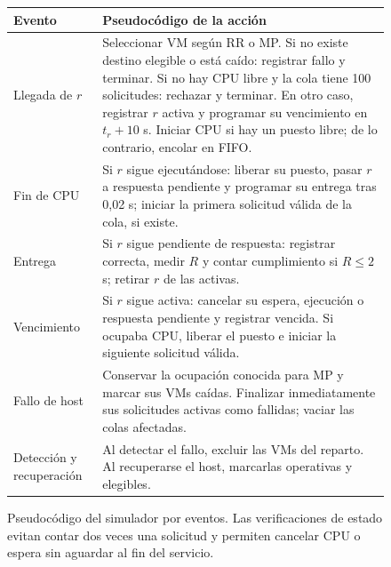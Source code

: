 \begin{figure}[t]
\centering\footnotesize
\begin{tabularx}{\columnwidth}{@{}>{\raggedright\arraybackslash}p{}Y@{}}
\toprule
\textbf{Evento} & \textbf{Pseudocódigo de la acción}\\\midrule
Llegada de $r$ & Seleccionar VM según RR o MP. Si no existe destino elegible o está caído: registrar fallo y terminar. Si no hay CPU libre y la cola tiene 100 solicitudes: rechazar y terminar. En otro caso, registrar $r$ activa y programar su vencimiento en $t_r+10$ s. Iniciar CPU si hay un puesto libre; de lo contrario, encolar en FIFO.\\[3pt]
Fin de CPU & Si $r$ sigue ejecutándose: liberar su puesto, pasar $r$ a respuesta pendiente y programar su entrega tras 0,02 s; iniciar la primera solicitud válida de la cola, si existe.\\[3pt]
Entrega & Si $r$ sigue pendiente de respuesta: registrar correcta, medir $R$ y contar cumplimiento si $R\leq2$ s; retirar $r$ de las activas.\\[3pt]
Vencimiento & Si $r$ sigue activa: cancelar su espera, ejecución o respuesta pendiente y registrar vencida. Si ocupaba CPU, liberar el puesto e iniciar la siguiente solicitud válida.\\[3pt]
Fallo de host & Conservar la ocupación conocida para MP y marcar sus VMs caídas. Finalizar inmediatamente sus solicitudes activas como fallidas; vaciar las colas afectadas.\\[3pt]
Detección y recuperación & Al detectar el fallo, excluir las VMs del reparto. Al recuperarse el host, marcarlas operativas y elegibles.\\\bottomrule
\end{tabularx}
\caption{Pseudocódigo del simulador por eventos. Las verificaciones de estado evitan contar dos veces una solicitud y permiten cancelar CPU o espera sin aguardar al fin del servicio.}
\label{fig:pseudocodigo}
\end{figure}

